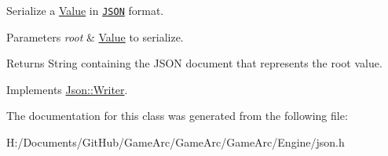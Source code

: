 Serialize a \hyperlink{class_json_1_1_value}{Value} in \href{http://www.json.org}{\tt J\+S\+O\+N} format. 


\begin{DoxyParams}{Parameters}
{\em root} & \hyperlink{class_json_1_1_value}{Value} to serialize. \\
\hline
\end{DoxyParams}
\begin{DoxyReturn}{Returns}
String containing the J\+S\+O\+N document that represents the root value. 
\end{DoxyReturn}


Implements \hyperlink{class_json_1_1_writer}{Json\+::\+Writer}.



The documentation for this class was generated from the following file\+:\begin{DoxyCompactItemize}
\item 
H\+:/\+Documents/\+Git\+Hub/\+Game\+Arc/\+Game\+Arc/\+Game\+Arc/\+Engine/json.\+h\end{DoxyCompactItemize}
